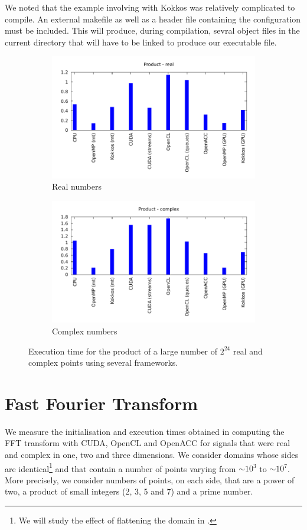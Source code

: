 \documentclass[12pt, a4paper]{article}
\begin{document}
We noted that the example involving with Kokkos was relatively complicated to compile. An external makefile as well as a header file containing the configuration must be included. This will produce, during compilation, sevral object files in the current directory that will have to be linked to produce our executable file. 
\begin{figure}[H]
\captionsetup{width=0.8\linewidth}
\centering
\begin{subfigure}{.5\textwidth}
\centering
\includegraphics[width=.9\linewidth]{graphs/product-r.pdf}
\caption{Real numbers}
\label{PRODR}
\end{subfigure}%
\begin{subfigure}{.5\textwidth}
\centering
\includegraphics[width=.9\linewidth]{graphs/product-c.pdf}
\caption{Complex numbers}
\label{PRODC}
\end{subfigure}
\caption{Execution time for the product of a large number of $2^{24}$ real and complex points using several frameworks.}
\label{1DFFTW}
\end{figure}



\section{Fast Fourier Transform}
We measure the initialisation and execution times obtained in computing the FFT transform with CUDA, OpenCL and OpenACC for signals that were real and complex in one, two and three dimensions. We consider domains whose sides are identical\footnote{We will study the effect of flattening the domain in .} and that contain a number of points varying from $\sim 10^3$ to $\sim 10^7$. More precisely, we consider numbers of points, on each side, that are a power of two, a product of small integers (2, 3, 5 and 7) and a prime number. \\
\end{document}
